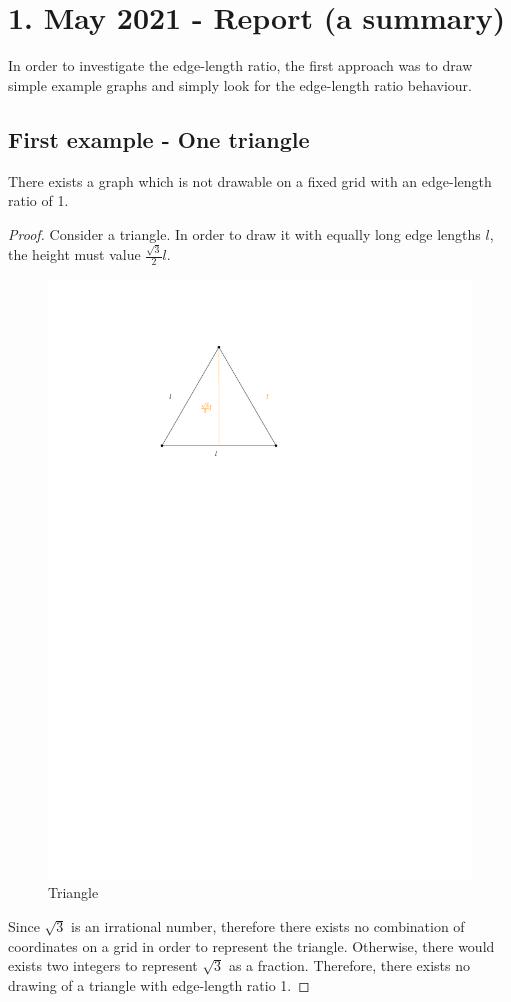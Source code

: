 \section{1. May 2021 - Report (a summary)}
In order to investigate the edge-length ratio, the first approach was to draw simple example graphs and simply look for the edge-length ratio behaviour.
\subsection{First example - One triangle}
\begin{lemma}
	There exists a graph which is not drawable on a fixed grid with an edge-length ratio of 1.
\end{lemma}
\begin{proof}
	Consider a triangle. In order to draw it with equally long edge lengths $l$, the height must value $\frac{\sqrt{3}}{2}l$.
		\begin{figure}[H]
		\centering
		\includegraphics[page=1]{drawings/previous-results.pdf}
		\caption{Triangle}
	\end{figure}
	Since $\sqrt{3}$ is an irrational number, therefore there exists no combination of coordinates on a grid in order to represent the triangle. Otherwise, there would exists two integers to represent $\sqrt{3}$ as a fraction. Therefore, there exists no drawing of a triangle with edge-length ratio 1.
\end{proof}
